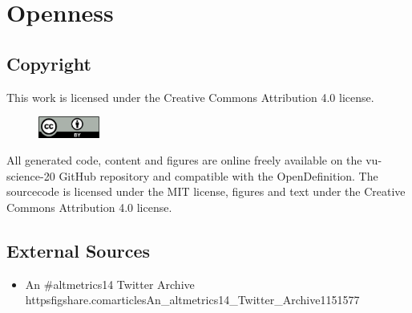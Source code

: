 \documentclass[fleqn,10pt,lineno]{wlpeerj} %
\begin{document}
\section*{Openness}

\subsection*{Copyright}

This work is licensed under the Creative Commons Attribution 4.0 license.

\begin{figure}[ht]
\raggedright
\includegraphics[width=2cm]{cc-by.png}
\label{fig:cc-by}
\end{figure}

All generated code, content and figures are online freely available on the vu-science-20 GitHub repository \citep{github_vu-science-20} and compatible with the OpenDefinition. The sourcecode is licensed under the MIT license, figures and text under the Creative Commons Attribution 4.0 license.

\subsection*{External Sources}

\begin{itemize}
\item An \#altmetrics14 Twitter Archive https\:\/\/figshare.com\/articles\/An\_altmetrics14\_Twitter\_Archive\/1151577
\end{itemize}


\end{document}
